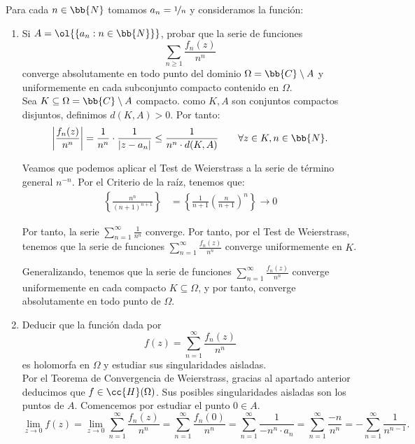\documentclass[12pt]{article}
\begin{document}
    \begin{ejercicio}[2.5 puntos]
        Para cada $n \in \bb{N}$ tomamos $a_n = \nicefrac{1}{n}$ y consideramos la función:
        \begin{enumerate}
            \item Si $A = \ol{\{a_n : n \in \bb{N}\}}$, probar que la serie de funciones
            \[
                \sum_{n \geq 1} \frac{f_n(z)}{n^n}
            \]
            converge absolutamente en todo punto del dominio $\Omega = \bb{C}\setminus A$ y uniformemente en cada subconjunto compacto contenido en $\Omega$.\\

            Sea $K \subseteq \Omega=\bb{C}\setminus A$ compacto. como $K,A$ son conjuntos compactos disjuntos, definimos $d(K,A)>0$. Por tanto:
            \begin{equation*}
                \left|\dfrac{f_n(z)}{n^n}\right| = \frac{1}{n^n}\cdot \dfrac{1}{|z - a_n|} \leq \frac{1}{n^n\cdot d(K,A)}\qquad \forall z\in K, n\in \bb{N}.
            \end{equation*}

            Veamos que podemos aplicar el Test de Weierstrass a la serie de término general $n^{-n}$. Por el Criterio de la raíz, tenemos que:
            \begin{align*}
                \left\{\frac{n^n}{{(n+1)}^{n+1}}\right\} &= \left\{\frac{1}{n+1}\left(\frac{n}{n+1}\right)^n\right\}\to 0
            \end{align*}

            Por tanto, la serie $\sum\limits_{n=1}^{\infty} \frac{1}{n^n}$ converge. Por tanto, por el Test de Weierstrass, tenemos que la serie de funciones $\sum\limits_{n=1}^{\infty} \frac{f_n(z)}{n^n}$ converge uniformemente en $K$.

            Generalizando, tenemos que la serie de funciones $\sum\limits_{n=1}^{\infty} \frac{f_n(z)}{n^n}$ converge uniformemente en cada compacto $K\subseteq \Omega$, y por tanto, converge absolutamente en todo punto de $\Omega$.


            \item Deducir que la función dada por
            \[
                f(z) = \sum_{n=1}^{\infty} \frac{f_n(z)}{n^n}
            \]
            es holomorfa en $\Omega$ y estudiar sus singularidades aisladas.\\

            Por el Teorema de Convergencia de Weierstrass, gracias al apartado anterior deducimos que $f\in \cc{H}(\Omega)$. Sus posibles singularidades aisladas son los puntos de $A$. Comencemos por estudiar el punto $0\in A$.
            \begin{equation*}
                \lim_{z\to 0} f(z) = \lim_{z\to 0} \sum_{n=1}^{\infty} \frac{f_n(z)}{n^n} = \sum_{n=1}^{\infty} \frac{f_n(0)}{n^n} = \sum_{n=1}^{\infty} \dfrac{1}{ - n^n\cdot a_n} = \sum_{n=1}^{\infty} \dfrac{-n}{n^{n}} = -\sum_{n=1}^{\infty} \dfrac{1}{n^{n-1}}.
            \end{equation*}


\end{enumerate}
\end{ejercicio}
\end{document}
